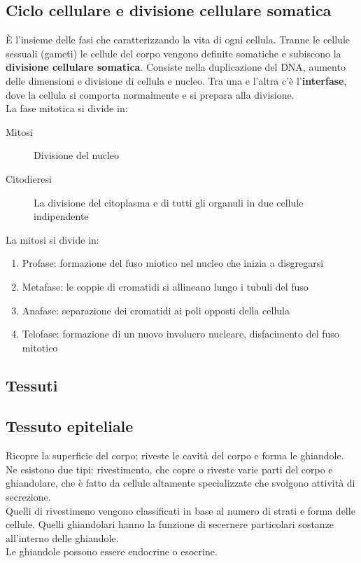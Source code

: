 \documentclass[a4paper]{article}
\begin{document}
\subsection{Ciclo cellulare e divisione cellulare somatica}
È l'insieme delle fasi che caratterizzando la vita di ogni cellula. Tranne le
cellule sessuali (gameti) le cellule del corpo vengono definite somatiche e 
subiscono la \textbf{divisione cellulare somatica}. Consiste nella duplicazione
del DNA, aumento delle dimensioni e divisione di cellula e nucleo. Tra una e 
l'altra c'è l'\textbf{interfase}, dove la cellula si comporta normalmente e si
prepara alla divisione. \\ 
La fase mitotica si divide in:
\begin{description}
\item[Mitosi] Divisione del nucleo
\item[Citodieresi] La divisione del citoplasma e di tutti gli organuli in due
cellule indipendente
\end{description}
La mitosi si divide in:
\begin{enumerate}
    \item Profase: formazione del fuso miotico nel nucleo che inizia a
    disgregarsi
    \item Metafase: le coppie di cromatidi si allineano lungo i tubuli del fuso
    \item Anafase: separazione dei cromatidi ai poli opposti della cellula
    \item Telofase: formazione di un nuovo involucro nucleare, disfacimento del 
    fuso mitotico
\end{enumerate}
\subsection{Tessuti}
\subsection{Tessuto epiteliale}
Ricopre la superficie del corpo; riveste le cavità del corpo e forma le 
ghiandole. Ne esistono due tipi: rivestimento, che copre o riveste varie parti
del corpo e ghiandolare, che è fatto da cellule altamente specializzate che 
svolgono attività di secrezione. \\
Quelli di rivestimeno vengono classificati in base al numero di strati e forma
delle cellule. Quelli ghiandolari hanno la funzione di secernere particolari
sostanze all'interno delle ghiandole. \\
Le ghiandole possono essere endocrine o esocrine.
\end{document}
